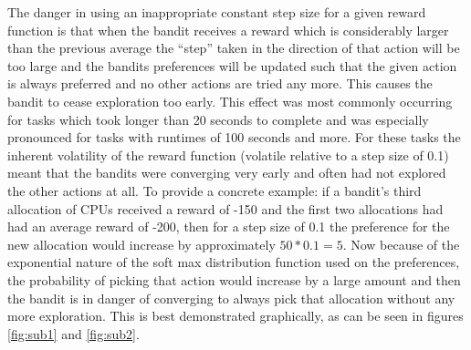 The danger in using an inappropriate constant step size for a given reward function is that when the bandit receives a reward which is considerably larger than the previous average the “step” taken in the direction of that action will be too large and the bandits preferences will be updated such that the given action is always preferred and no other actions are tried any more. This causes the bandit to cease exploration too early. This effect was most commonly occurring for tasks which took longer than 20 seconds to complete and was especially pronounced for tasks with runtimes of 100 seconds and more.  For these tasks the inherent volatility of the reward function (volatile relative to a step size of 0.1) meant that the bandits were converging very early and often had not explored the other actions at all. To provide a concrete example: if a bandit’s third allocation of CPUs received a reward of -150 and the first two allocations had had an average reward of -200, then for a step size of 0.1 the preference for the new allocation would increase by approximately $50*0.1=5$. Now because of the exponential nature of the soft max distribution function used on the preferences, the probability of picking that action would increase by a large amount and then the bandit is in danger of converging to always pick that allocation without any more exploration. This is best demonstrated graphically, as can be seen in figures \ref{fig:sub1} and \ref{fig:sub2}.

